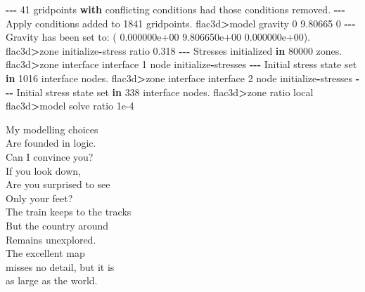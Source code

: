 \documentclass[a4paper, nobind]{templates/ociamthesis}
\newenvironment{Shaded}{\begin{snugshade}}{\end{snugshade}}
\newcommand{\BuiltInTok}[1]{#1}
\newcommand{\ControlFlowTok}[1]{\textcolor[rgb]{0.13,0.29,0.53}{\textbf{#1}}}
\newcommand{\DecValTok}[1]{\textcolor[rgb]{0.00,0.00,0.81}{#1}}
\newcommand{\FloatTok}[1]{\textcolor[rgb]{0.00,0.00,0.81}{#1}}
\newcommand{\KeywordTok}[1]{\textcolor[rgb]{0.13,0.29,0.53}{\textbf{#1}}}
\newcommand{\NormalTok}[1]{#1}
\newcommand{\OperatorTok}[1]{\textcolor[rgb]{0.81,0.36,0.00}{\textbf{#1}}}
\newcommand{\StringTok}[1]{\textcolor[rgb]{0.31,0.60,0.02}{#1}}
\renewenvironment{Shaded}
{
  \vspace{10pt}%
  \begin{snugshade}%
}{%
  \end{snugshade}%
  \vspace{8pt}%
}
\begin{document}
\begin{Shaded}
\begin{Highlighting}[]
\OperatorTok{{-}{-}{-}} \DecValTok{41}\NormalTok{ gridpoints }\ControlFlowTok{with}\NormalTok{ conflicting conditions had those conditions removed.}
\OperatorTok{{-}{-}{-}}\NormalTok{ Apply conditions added to }\DecValTok{1841}\NormalTok{ gridpoints.}
\NormalTok{flac3d}\OperatorTok{\textgreater{}}\NormalTok{model gravity }\DecValTok{0} \FloatTok{9.80665} \DecValTok{0}
\OperatorTok{{-}{-}{-}}\NormalTok{ Gravity has been }\BuiltInTok{set}\NormalTok{ to: ( }\FloatTok{0.000000e+00} \FloatTok{9.806650e+00} \FloatTok{0.000000e+00}\NormalTok{).}
\NormalTok{flac3d}\OperatorTok{\textgreater{}}\NormalTok{zone initialize}\OperatorTok{{-}}\NormalTok{stress ratio }\FloatTok{0.318}
\OperatorTok{{-}{-}{-}}\NormalTok{ Stresses initialized }\KeywordTok{in} \DecValTok{80000}\NormalTok{ zones.}
\NormalTok{flac3d}\OperatorTok{\textgreater{}}\NormalTok{zone interface }\StringTok{\textquotesingle{}interface 1\textquotesingle{}}\NormalTok{ node initialize}\OperatorTok{{-}}\NormalTok{stresses}
\OperatorTok{{-}{-}{-}}\NormalTok{ Initial stress state }\BuiltInTok{set} \KeywordTok{in} \DecValTok{1016}\NormalTok{ interface nodes.}
\NormalTok{flac3d}\OperatorTok{\textgreater{}}\NormalTok{zone interface }\StringTok{\textquotesingle{}interface 2\textquotesingle{}}\NormalTok{ node initialize}\OperatorTok{{-}}\NormalTok{stresses}
\OperatorTok{{-}{-}{-}}\NormalTok{ Initial stress state }\BuiltInTok{set} \KeywordTok{in} \DecValTok{338}\NormalTok{ interface nodes.}
\NormalTok{flac3d}\OperatorTok{\textgreater{}}\NormalTok{zone ratio local}
\NormalTok{flac3d}\OperatorTok{\textgreater{}}\NormalTok{model solve ratio }\FloatTok{1e{-}4}
\end{Highlighting}
\end{Shaded}

\newpage

\begin{savequote}
My modelling choices\\
Are founded in logic.\\
Can I convince you?\\
If you look down,\\
Are you surprised to see\\
Only your feet?\\
The train keeps to the tracks\\
But the country around\\
Remains unexplored.\\
The excellent map\\
misses no detail, but it is\\
as large as the world.
\end{savequote}
\end{document}
